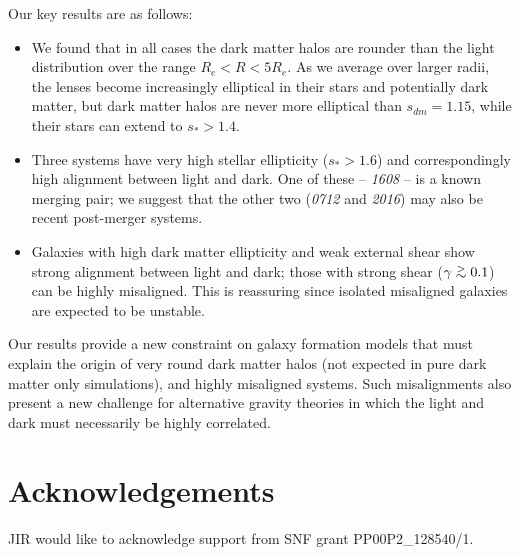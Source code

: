 \documentclass[useAMS,usenatbib]{mn2e}
\def\gtsima{$\; \buildrel > \over \sim \;$}
\def\simgt{\lower.5ex\hbox{\gtsima}}
\begin{document}
Our key results are as follows:

\begin{itemize}
\item We found that in all cases the dark matter halos are rounder than the light distribution over the range $R_e < R < 5R_e$. As we average over larger radii, the lenses become increasingly elliptical in their stars and potentially dark matter, but dark matter halos are never more elliptical than $s_{dm} = 1.15$, while their stars can extend to $s_* > 1.4$. 

\item Three systems have very high stellar ellipticity ($s_* > 1.6$) and correspondingly high alignment between light and dark. One of these -- {\it1608} -- is a known merging pair; we suggest that the other two ({\it0712} and {\it2016}) may also be recent post-merger systems. 

\item Galaxies with high dark matter ellipticity and weak external shear show strong alignment between light and dark; those with strong shear ($\gamma \simgt 0.1$) can be highly misaligned. This is reassuring since isolated misaligned galaxies are expected to be unstable.
\end{itemize}

Our results provide a new constraint on galaxy formation models that must explain the origin of very round dark matter halos (not expected in pure dark matter only simulations), and highly misaligned systems. Such misalignments also present a new challenge for alternative gravity theories in which the light and dark must necessarily be highly correlated.

\section{Acknowledgements}\label{sec:acknowledgements}
JIR would like to acknowledge support from SNF grant PP00P2\_128540/1.




\appendix
\end{document}
